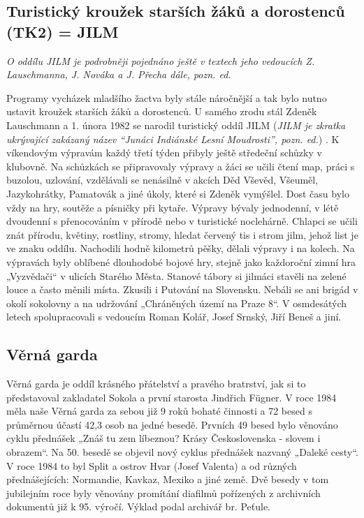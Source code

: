 \subsection{Turistický kroužek starších žáků a dorostenců (TK2) =
JILM}\label{turistickuxfd-krouux17eek-starux161uxedch-ux17euxe1kux16f-a-dorostencux16f-tk2-jilm}

\emph{O oddílu JILM je podrobněji pojednáno ještě v textech jeho
vedoucích Z. Lauschmanna, J. Nováka a J. Přecha dále, pozn. ed.}

Programy vycházek mladšího žactva byly stále náročnější a tak bylo nutno
ustavit kroužek starších žáků a dorostenců. U samého zrodu stál Zdeněk
Lauschmann a 1. února 1982 se narodil turistický oddíl JILM (\emph{JILM
je zkratka ukrývající zakázaný název ``Junáci Indiánské Lesní
Moudrosti'', pozn. ed.}) . K víkendovým výpravám každý třetí týden
přibyly ještě středeční schůzky v klubovně. Na schůzkách se připravovaly
výpravy a žáci se učili čtení map, práci s buzolou, uzlování, vzdělávali
se nenásilně v akcích Děd Vševěd, Všeuměl, Jazykohrátky, Pamatovák a
jiné úkoly, které si Zdeněk vymýšlel. Dost času bylo vždy na hry,
soutěže a písničky při kytaře. Výpravy bývaly jednodenní, v létě
dvoudenní s přenocováním v přírodě nebo v turistické noclehárně. Chlapci
se učili znát přírodu, květiny, rostliny, stromy, hledat červený tis i
strom jilm, jehož list je ve znaku oddílu. Nachodili hodně kilometrů
pěšky, dělali výpravy i na kolech. Na výpravách byly oblíbené dlouhodobé
bojové hry, stejně jako každoroční zimní hra „Vyzvědači`` v ulicích
Starého Města. Stanové tábory si jilmáci stavěli na zelené louce a často
měnili místa. Zkusili i Putování na Slovensku. Nebáli se ani brigád v
okolí sokolovny a na udržování „Chráněných území na Praze 8``. V
osmdesátých letech spolupracovali s vedoucím Roman Kolář, Josef Srnský,
Jiří Beneš a jiní.

\subsection{Věrná garda}\label{vux11brnuxe1-garda}

Věrná garda je oddíl krásného přátelství a pravého bratrství, jak si to
představoval zakladatel Sokola a první starosta Jindřich Fügner. V roce
1984 měla naše Věrná garda za sebou již 9 roků bohaté činnosti a 72
besed s průměrnou účastí 42,3 osob na jedné besedě. Prvních 49 besed
bylo věnováno cyklu přednášek „Znáš tu zem líbeznou? Krásy
Československa - slovem i obrazem``. Na 50. besedě se objevil nový
cyklus přednášek nazvaný „Daleké cesty``. V roce 1984 to byl Split a
ostrov Hvar (Josef Valenta) a od různých přednášejících: Normandie,
Kavkaz, Mexiko a jiné země. Dvě besedy v tom jubilejním roce byly
věnovány promítání diafilmů pořízených z archivních dokumentů již k 95.
výročí. Výklad podal archivář br. Peťule.

